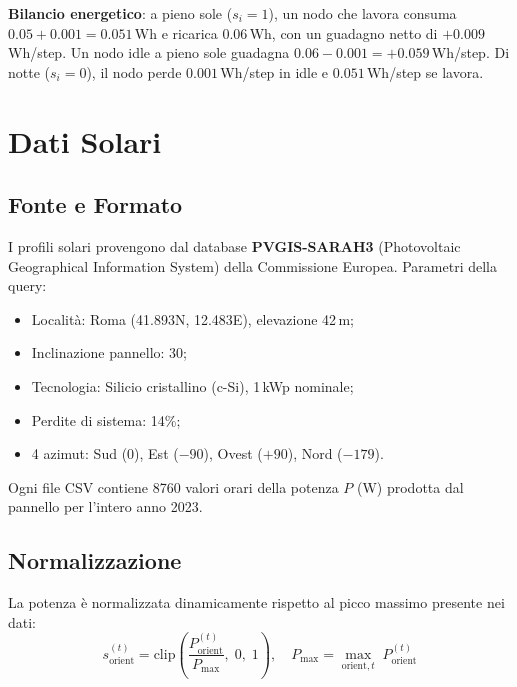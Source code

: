 \documentclass[11pt,a4paper]{article}
\begin{document}
\textbf{Bilancio energetico}: a pieno sole ($s_i = 1$), un nodo che lavora consuma $0.05 + 0.001 = 0.051$\,Wh e ricarica $0.06$\,Wh, con un guadagno netto di $+0.009$\,Wh/step. Un nodo idle a pieno sole guadagna $0.06 - 0.001 = +0.059$\,Wh/step. Di notte ($s_i = 0$), il nodo perde $0.001$\,Wh/step in idle e $0.051$\,Wh/step se lavora.

\section{Dati Solari}

\subsection{Fonte e Formato}

I profili solari provengono dal database \textbf{PVGIS-SARAH3} (Photovoltaic Geographical Information System) della Commissione Europea. Parametri della query:
\begin{itemize}[nosep]
    \item Localit\`a: Roma (41.893\textdegree N, 12.483\textdegree E), elevazione 42\,m;
    \item Inclinazione pannello: 30\textdegree;
    \item Tecnologia: Silicio cristallino (c-Si), 1\,kWp nominale;
    \item Perdite di sistema: 14\%;
    \item 4 azimut: Sud (0\textdegree), Est ($-90$\textdegree), Ovest ($+90$\textdegree), Nord ($-179$\textdegree).
\end{itemize}

Ogni file CSV contiene 8760 valori orari della potenza $P$ (W) prodotta dal pannello per l'intero anno 2023.

\subsection{Normalizzazione}

La potenza \`e normalizzata dinamicamente rispetto al picco massimo presente nei dati:
\begin{equation}
s_{\text{orient}}^{(t)} = \text{clip}\!\left(\frac{P_{\text{orient}}^{(t)}}{P_{\max}},\; 0,\; 1\right), \quad P_{\max} = \max_{\text{orient}, t}\; P_{\text{orient}}^{(t)}
\end{equation}
\end{document}
